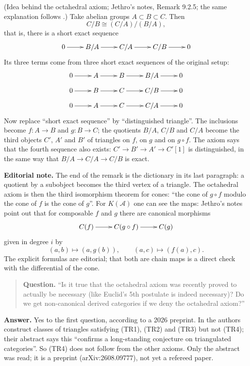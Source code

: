 \begin{remark}
\label{remark-octahedral-intuition}
(Idea behind the octahedral axiom;
Jethro's notes, Remark 9.2.5; the same
explanation follows
\cite[Definition 1.32]{huybrechts-fm}.)
Take abelian groups
$A\subset B\subset C$. Then
$$
C/B\cong (C/A)/(B/A),
$$
that is, there is a short exact sequence
$$
\xymatrix{
0\ar[r]
&B/A\ar[r]
&C/A\ar[r]
&C/B\ar[r]
&0
}
$$
Its three terms come from three short
exact sequences of the original setup:
$$
\xymatrix@R=0.6em{
0\ar[r]&A\ar[r]&B\ar[r]&B/A\ar[r]&0\\
0\ar[r]&B\ar[r]&C\ar[r]&C/B\ar[r]&0\\
0\ar[r]&A\ar[r]&C\ar[r]&C/A\ar[r]&0
}
$$
Now replace ``short exact sequence'' by
``distinguished triangle''. The
inclusions become $f:A\to B$ and
$g:B\to C$; the quotients $B/A$, $C/B$
and $C/A$ become the third objects $C'$,
$A'$ and $B'$ of triangles on $f$, on
$g$ and on $g\circ f$. The axiom says
that the fourth sequence also exists:
$C'\to B'\to A'\to C'[1]$ is
distinguished, in the same way that
$B/A\to C/A\to C/B$ is exact.
\end{remark}

\noindent
\textbf{Editorial note.} The end of the
remark is the dictionary in its last
paragraph: a quotient by a subobject
becomes the third vertex of a triangle.
The octahedral axiom is then the third
isomorphism theorem for cones: ``the cone
of $g\circ f$ modulo the cone of $f$ is
the cone of $g$''. For $K(\mathcal{A})$
one can see the maps: Jethro's notes
point out that for composable $f$ and
$g$ there are canonical morphisms
$$
\xymatrix{
C(f)\ar[r]
&C(g\circ f)\ar[r]
&C(g)
}
$$
given in degree $i$ by
$$
(a,b)\mapsto(a,g(b)),
\qquad
(a,c)\mapsto(f(a),c).
$$
The explicit formulas are editorial;
that both are chain maps is a direct
check with the differential of the cone.

\begin{quote}
\textbf{Question.} ``Is it true
that the octahedral axiom was recently
proved to actually be necessary (like
Euclid's 5th postulate is indeed
necessary)? Do we get non-canonical
derived categories if we deny the
octahedral axiom?''
\end{quote}

\noindent
\textbf{Answer.} Yes to the
first question, according to a 2026
preprint. In \cite{cilsz-tr4} the
authors construct classes of triangles
satisfying (TR1), (TR2) and (TR3) but
not (TR4); their abstract says this
``confirms a long-standing conjecture on
triangulated categories''. So (TR4) does
not follow from the other axioms. Only
the abstract was read; it is a preprint
(arXiv:2608.09777), not yet a refereed
paper.

